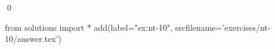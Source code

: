 
\begin{ex} 
  \label{ex:nt-10}
  
  \qed
\end{ex} 
\begin{python0}
from solutions import *
add(label="ex:nt-10",
    srcfilename='exercises/nt-10/answer.tex') 
\end{python0}
